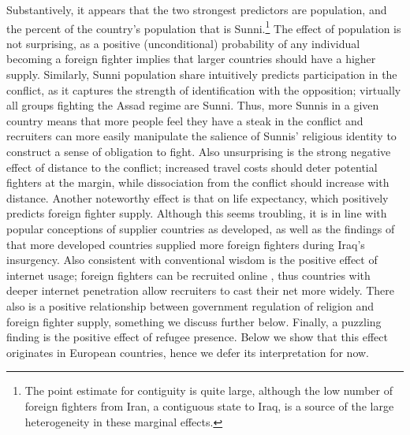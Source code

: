\documentclass[12pt]{article}
\begin{document}
Substantively, it appears that the two strongest predictors are population, and the percent of the country's population that is Sunni.\footnote{The point estimate for contiguity is quite large, although the low number of foreign fighters from Iran, a contiguous state to Iraq, is a source of the large heterogeneity in these marginal effects.} The effect of population is not surprising, as a positive (unconditional) probability of any individual becoming a foreign fighter implies that larger countries should have a higher supply. Similarly, Sunni population share intuitively predicts participation in the conflict, as it captures the strength of identification with the opposition; virtually all groups fighting the Assad regime are Sunni. Thus, more Sunnis in a given country means that more people feel they have a steak in the conflict and recruiters can more easily manipulate the salience of Sunnis' religious identity to construct a sense of obligation to fight. Also unsurprising is the strong negative effect of distance to the conflict; increased travel costs should deter potential fighters at the margin, while dissociation from the conflict should increase with distance. Another noteworthy effect is that on life expectancy, which positively predicts foreign fighter supply. Although this seems troubling, it is in line with popular conceptions of supplier countries as developed, as well as the findings of \cite{Hewitt2009} that more developed countries supplied more foreign fighters during Iraq's insurgency. Also consistent with conventional wisdom is the positive effect of internet usage; foreign fighters can be recruited online \citep{Hegghammer2011}, thus countries with deeper internet penetration allow recruiters to cast their net more widely. There also is a positive relationship between government regulation of religion and foreign fighter supply, something we discuss further below. Finally, a puzzling finding is the positive effect of refugee presence. Below we show that this effect originates in European countries, hence we defer its interpretation for now. 		 \\
\end{document}
